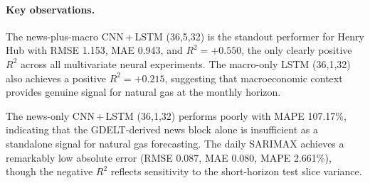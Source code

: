 \documentclass[12pt,a4paper]{article}
\begin{document}
\begin{table}[H]
\centering
\caption{Selected multivariate outputs for Henry Hub natural gas. The news-plus-macro CNN\,+\,LSTM (36,5,32) achieves the best test RMSE of 1.153 with the only positive $R^2 = +0.550$.}\label{tab:cng-multi}
\small
{}
\end{table}

\paragraph{Key observations.} The news-plus-macro CNN\,+\,LSTM (36,5,32) is the standout performer for Henry Hub with RMSE 1.153, MAE 0.943, and $R^2 = +0.550$, the only clearly positive $R^2$ across all multivariate neural experiments. The macro-only LSTM (36,1,32) also achieves a positive $R^2 = +0.215$, suggesting that macroeconomic context provides genuine signal for natural gas at the monthly horizon.

The news-only CNN\,+\,LSTM (36,1,32) performs poorly with MAPE 107.17\%, indicating that the GDELT-derived news block alone is insufficient as a standalone signal for natural gas forecasting. The daily SARIMAX achieves a remarkably low absolute error (RMSE 0.087, MAE 0.080, MAPE 2.661\%), though the negative $R^2$ reflects sensitivity to the short-horizon test slice variance.
\end{document}
